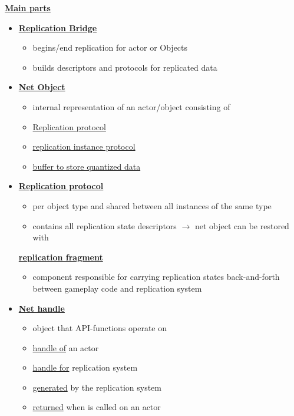         \textbf{\uline{Main parts}}
        \begin{itemize}
            \item \textbf{\uline{Replication Bridge}}
            \begin{itemize}
                \item begins/end replication for actor or Objects
                \item builds descriptors and protocols for replicated data
            \end{itemize}
            \item \textbf{\uline{Net Object}}
            \begin{itemize}
                \item internal representation of an actor/object consisting of
                \item \uline{Replication protocol}
                \item \uline{replication instance protocol}
                \item \uline{buffer to store quantized data}
            \end{itemize}
            \item \textbf{\uline{Replication protocol}}
            \begin{itemize}
                \item per object type and shared between all instances of the same type
                \item contains all replication state descriptors $\rightarrow$ net object can be restored with
            \end{itemize}
            \textbf{\uline{replication fragment}}
            \begin{itemize}
                \item component responsible for carrying replication states back-and-forth between gameplay code and replication system
            \end{itemize}
            \item \textbf{\uline{Net handle}}
            \begin{itemize}
                \item object that API-functions operate on
                \item \uline{handle of} an actor
                \item \uline{handle for} replication system
                \item \uline{generated} by the replication system
                \item \uline{returned} when  is called on an actor
            \end{itemize}
        \end{itemize}


